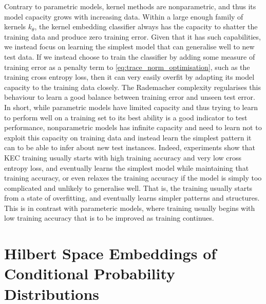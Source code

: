\documentclass{article}
\begin{document}
%
	
	Contrary to parametric models, kernel methods are nonparametric, and thus its model capacity grows with increasing data. Within a large enough family of kernels $k_{\theta}$, the kernel embedding classifier always has the capacity to shatter the training data and produce zero training error. Given that it has such capabilities, we instead focus on learning the simplest model that can generalise well to new test data. If we instead choose to train the classifier by adding some measure of training error as a penalty term to \eqref{eq:trace_norm_optimisation}, such as the training cross entropy loss, then it can very easily overfit by adapting its model capacity to the training data closely. The Rademacher complexity regularises this behaviour to learn a good balance between training error and unseen test error. In short, while parametric models have limited capacity and thus trying to learn to perform well on a training set to its best ability is a good indicator to test performance, nonparametric models has infinite capacity and need to learn not to exploit this capacity on training data and instead learn the simplest pattern it can to be able to infer about new test instances. Indeed, experiments show that KEC training usually starts with high training accuracy and very low cross entropy loss, and eventually learns the simplest model while maintaining that training accuracy, or even relaxes the training accuracy if the model is simply too complicated and unlikely to generalise well. That is, the training usually starts from a state of overfitting, and eventually learns simpler patterns and structures. This is in contrast with parameteric models, where training usually begins with low training accuracy that is to be improved as training continues.
	
\section{Hilbert Space Embeddings of Conditional Probability Distributions}
\label{sec:background}
\end{document}
